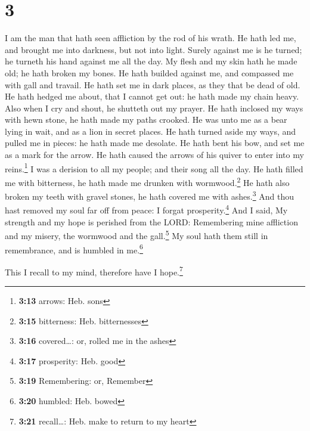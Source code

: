 \hypertarget{section-2}{%
\section{3}\label{section-2}}

 I am the man that hath seen affliction by the rod of his
wrath.  He hath led me, and brought me into darkness, but
not into light.  Surely against me is he turned; he
turneth his hand against me all the day.  My flesh and my
skin hath he made old; he hath broken my bones.  He hath
builded against me, and compassed me with gall and travail.
 He hath set me in dark places, as they that be dead of
old.  He hath hedged me about, that I cannot get out: he
hath made my chain heavy.  Also when I cry and shout, he
shutteth out my prayer.  He hath inclosed my ways with
hewn stone, he hath made my paths crooked.  He was unto
me as a bear lying in wait, and as a lion in secret places.
 He hath turned aside my ways, and pulled me in pieces:
he hath made me desolate.  He hath bent his bow, and set
me as a mark for the arrow.  He hath caused the arrows of
his quiver to enter into my reins.\footnote{\textbf{3:13} arrows: Heb.
  sons}  I was a derision to all my people; and their
song all the day.  He hath filled me with bitterness, he
hath made me drunken with wormwood.\footnote{\textbf{3:15} bitterness:
  Heb. bitternesses}  He hath also broken my teeth with
gravel stones, he hath covered me with ashes.\footnote{\textbf{3:16}
  covered\ldots: or, rolled me in the ashes}  And thou
hast removed my soul far off from peace: I forgat prosperity.\footnote{\textbf{3:17}
  prosperity: Heb. good}  And I said, My strength and my
hope is perished from the LORD:  Remembering mine
affliction and my misery, the wormwood and the gall.\footnote{\textbf{3:19}
  Remembering: or, Remember}  My soul hath them still in
remembrance, and is humbled in me.\footnote{\textbf{3:20} humbled: Heb.
  bowed}

 This I recall to my mind, therefore have I
hope.\footnote{\textbf{3:21} recall\ldots: Heb. make to return to my
  heart}

